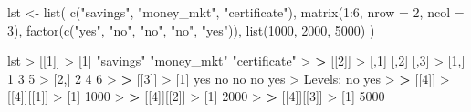 \documentclass[
]{book}
\newenvironment{Shaded}{\begin{snugshade}}{\end{snugshade}}
\newcommand{\AttributeTok}[1]{\textcolor[rgb]{0.77,0.63,0.00}{#1}}
\newcommand{\DecValTok}[1]{\textcolor[rgb]{0.00,0.00,0.81}{#1}}
\newcommand{\ErrorTok}[1]{\textcolor[rgb]{0.64,0.00,0.00}{\textbf{#1}}}
\newcommand{\FunctionTok}[1]{\textcolor[rgb]{0.00,0.00,0.00}{#1}}
\newcommand{\NormalTok}[1]{#1}
\newcommand{\OtherTok}[1]{\textcolor[rgb]{0.56,0.35,0.01}{#1}}
\newcommand{\SpecialCharTok}[1]{\textcolor[rgb]{0.00,0.00,0.00}{#1}}
\newcommand{\StringTok}[1]{\textcolor[rgb]{0.31,0.60,0.02}{#1}}
\begin{document}
\begin{Shaded}
\begin{Highlighting}[]
\NormalTok{lst }\OtherTok{\textless{}{-}} \FunctionTok{list}\NormalTok{(}
  \FunctionTok{c}\NormalTok{(}\StringTok{"savings"}\NormalTok{, }\StringTok{"money\_mkt"}\NormalTok{, }\StringTok{"certificate"}\NormalTok{),}
  \FunctionTok{matrix}\NormalTok{(}\DecValTok{1}\SpecialCharTok{:}\DecValTok{6}\NormalTok{, }\AttributeTok{nrow =} \DecValTok{2}\NormalTok{, }\AttributeTok{ncol =} \DecValTok{3}\NormalTok{),}
  \FunctionTok{factor}\NormalTok{(}\FunctionTok{c}\NormalTok{(}\StringTok{"yes"}\NormalTok{, }\StringTok{"no"}\NormalTok{, }\StringTok{"no"}\NormalTok{, }\StringTok{"no"}\NormalTok{, }\StringTok{"yes"}\NormalTok{)),}
  \FunctionTok{list}\NormalTok{(}\DecValTok{1000}\NormalTok{, }\DecValTok{2000}\NormalTok{, }\DecValTok{5000}\NormalTok{)}
\NormalTok{)}

\NormalTok{lst}
\SpecialCharTok{\textgreater{}}\NormalTok{ [[}\DecValTok{1}\NormalTok{]]}
\SpecialCharTok{\textgreater{}}\NormalTok{ [}\DecValTok{1}\NormalTok{] }\StringTok{"savings"}     \StringTok{"money\_mkt"}   \StringTok{"certificate"}
\SpecialCharTok{\textgreater{}} 
\ErrorTok{\textgreater{}}\NormalTok{ [[}\DecValTok{2}\NormalTok{]]}
\SpecialCharTok{\textgreater{}}\NormalTok{      [,}\DecValTok{1}\NormalTok{] [,}\DecValTok{2}\NormalTok{] [,}\DecValTok{3}\NormalTok{]}
\SpecialCharTok{\textgreater{}}\NormalTok{ [}\DecValTok{1}\NormalTok{,]    }\DecValTok{1}    \DecValTok{3}    \DecValTok{5}
\SpecialCharTok{\textgreater{}}\NormalTok{ [}\DecValTok{2}\NormalTok{,]    }\DecValTok{2}    \DecValTok{4}    \DecValTok{6}
\SpecialCharTok{\textgreater{}} 
\ErrorTok{\textgreater{}}\NormalTok{ [[}\DecValTok{3}\NormalTok{]]}
\SpecialCharTok{\textgreater{}}\NormalTok{ [}\DecValTok{1}\NormalTok{] yes no  no  no  yes}
\SpecialCharTok{\textgreater{}}\NormalTok{ Levels}\SpecialCharTok{:}\NormalTok{ no yes}
\SpecialCharTok{\textgreater{}} 
\ErrorTok{\textgreater{}}\NormalTok{ [[}\DecValTok{4}\NormalTok{]]}
\SpecialCharTok{\textgreater{}}\NormalTok{ [[}\DecValTok{4}\NormalTok{]][[}\DecValTok{1}\NormalTok{]]}
\SpecialCharTok{\textgreater{}}\NormalTok{ [}\DecValTok{1}\NormalTok{] }\DecValTok{1000}
\SpecialCharTok{\textgreater{}} 
\ErrorTok{\textgreater{}}\NormalTok{ [[}\DecValTok{4}\NormalTok{]][[}\DecValTok{2}\NormalTok{]]}
\SpecialCharTok{\textgreater{}}\NormalTok{ [}\DecValTok{1}\NormalTok{] }\DecValTok{2000}
\SpecialCharTok{\textgreater{}} 
\ErrorTok{\textgreater{}}\NormalTok{ [[}\DecValTok{4}\NormalTok{]][[}\DecValTok{3}\NormalTok{]]}
\SpecialCharTok{\textgreater{}}\NormalTok{ [}\DecValTok{1}\NormalTok{] }\DecValTok{5000}
\end{Highlighting}
\end{Shaded}
\end{document}
